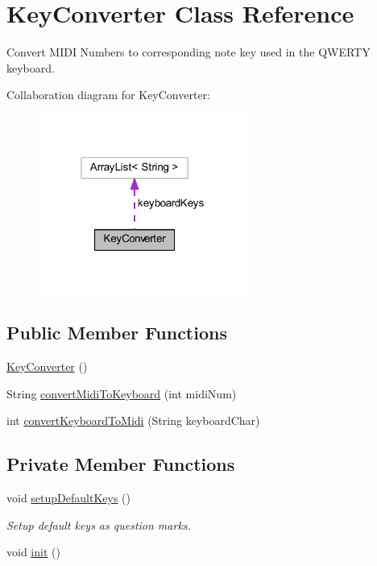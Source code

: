 \hypertarget{classcom_1_1lclion_1_1midiparser_1_1_key_converter}{\section{Key\+Converter Class Reference}
\label{classcom_1_1lclion_1_1midiparser_1_1_key_converter}
}


Convert M\+I\+D\+I Numbers to corresponding note key used in the Q\+W\+E\+R\+T\+Y keyboard.  




Collaboration diagram for Key\+Converter\+:\nopagebreak
\begin{figure}[H]
\begin{center}
\leavevmode
\includegraphics[width=196pt]{classcom_1_1lclion_1_1midiparser_1_1_key_converter__coll__graph}
\end{center}
\end{figure}
\subsection*{Public Member Functions}
\begin{DoxyCompactItemize}
\item 
\hyperlink{classcom_1_1lclion_1_1midiparser_1_1_key_converter_a9120cd6d8e70712293f11a7898c38f37}{Key\+Converter} ()
\item 
String \hyperlink{classcom_1_1lclion_1_1midiparser_1_1_key_converter_aa19949a61ff13647e0d76138ede95bf3}{convert\+Midi\+To\+Keyboard} (int midi\+Num)
\item 
int \hyperlink{classcom_1_1lclion_1_1midiparser_1_1_key_converter_a3d3303353cc49236c800b6ad8c6b7b1f}{convert\+Keyboard\+To\+Midi} (String keyboard\+Char)
\end{DoxyCompactItemize}
\subsection*{Private Member Functions}
\begin{DoxyCompactItemize}
\item 
void \hyperlink{classcom_1_1lclion_1_1midiparser_1_1_key_converter_a6d5d75a2ebe6d53c98735c6ce1f95241}{setup\+Default\+Keys} ()
\begin{DoxyCompactList}\small\item\em Setup default keys as question marks. \end{DoxyCompactList}\item 
void \hyperlink{classcom_1_1lclion_1_1midiparser_1_1_key_converter_a02fd73d861ef2e4aabb38c0c9ff82947}{init} ()
\end{DoxyCompactItemize}
